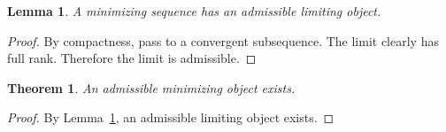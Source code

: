 \documentclass{article}
\newtheorem{lemma}{Lemma}
\newtheorem{theorem}{Theorem}
\begin{document}
\begin{lemma}\label{lem:sneaky-limit}
A minimizing sequence has an admissible limiting object.
\end{lemma}
\begin{proof}
By compactness, pass to a convergent subsequence.
The limit clearly has full rank.
Therefore the limit is admissible.
\end{proof}

\begin{theorem}\label{thm:sneaky-downstream}
An admissible minimizing object exists.
\end{theorem}
\begin{proof}
By Lemma~\ref{lem:sneaky-limit}, an admissible limiting object exists.
\end{proof}
\end{document}
